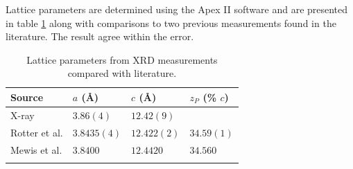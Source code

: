 Lattice parameters are determined using the Apex II software and are presented in table \ref{Table:ResD:LatticeParams} along with comparisons to two previous measurements found in the literature. The result agree within the error.
\begin{table}[htbp]
    \begin{center}
        \caption{Lattice parameters from \ac{XRD} measurements compared with literature.}
        \begin{tabular}{llll}
\toprule
Source  &  $a$ (\AA) & $c$ (\AA) & $z_P$ (\% $c$)\\
\midrule
X-ray   & $3.86(4)$  & $12.42(9)$ & \\
Rotter et al.\cite{Rotter2010} & $3.8435(4) $ & $12.422(2)$ & $34.59(1)$ \\
Mewis et al.\cite{Mewis1980} & $3.8400$ & $12.4420$ & $34.560$ \\
\bottomrule
        \label{Table:ResD:LatticeParams}
        \end{tabular}
    \end{center}
\end{table}
